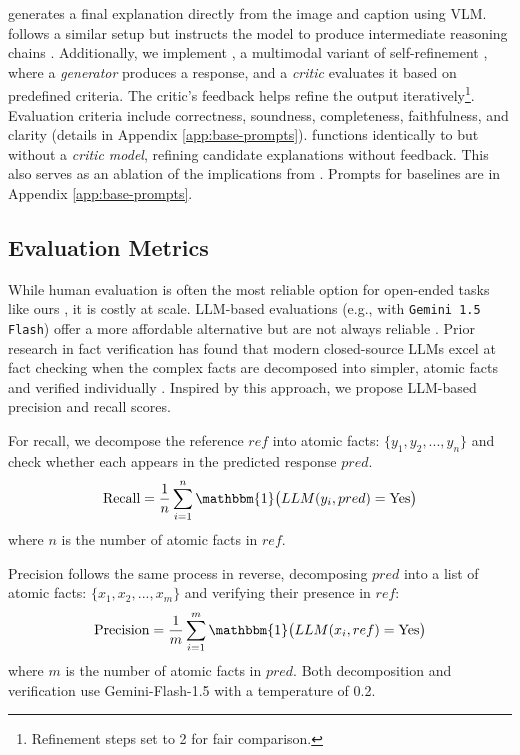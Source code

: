 \base{} generates a final explanation directly from the image and caption using VLM. \chain{} follows a similar setup but instructs the model to produce intermediate reasoning chains \cite{cot}. 
Additionally, we implement \critic{}, a multimodal variant of self-refinement \cite{madaan2023selfrefine}, where a \textit{generator} produces a response, and a \textit{critic} evaluates it based on predefined criteria. The critic's feedback helps refine the output iteratively\footnote{Refinement steps set to 2 for fair comparison.}. Evaluation criteria include correctness, soundness, completeness, faithfulness, and clarity (details in Appendix \ref{app:base-prompts}).
\nocritic{} functions identically to \critic{} but without a \textit{critic model}, refining candidate explanations without feedback. This also serves as an ablation of the implications from \method{}. Prompts for baselines are in Appendix \ref{app:base-prompts}.


\subsection{Evaluation Metrics}
\label{sec:exp_setup:eval}
While human evaluation is often the most reliable option for open-ended tasks like ours \cite{hwang-shwartz-2023-memecap}, it is costly at scale. LLM-based evaluations (e.g., with \texttt{Gemini 1.5 Flash}) offer a more affordable alternative but are not always reliable \cite{biases_paper}. Prior research in fact verification has found that modern closed-source LLMs excel at fact checking when the complex facts are decomposed into simpler, atomic facts and verified individually \cite{gunjal-durrett-2024-molecular, samir-etal-2024-locating}. Inspired by this approach, we propose LLM-based precision and recall scores.

For recall, we decompose the reference $ref$ into atomic facts: $\{y_1, y_2, ..., y_n\}$ and check whether each appears in the predicted response $pred$.
\[
\text{Recall} = \frac{1}{n} \sum_{i=1}^{n} \mathbbm{1} \big( LLM(y_i, pred) = \text{Yes} \big)
\]
where $n$ is the number of atomic facts in $ref$.

Precision follows the same process in reverse, decomposing $pred$ into a list of atomic facts: $\{x_1, x_2, ..., x_m\}$ and verifying their presence in $ref$:
\[
\text{Precision} = \frac{1}{m} \sum_{i=1}^{m} \mathbbm{1} \big( LLM(x_i, ref) = \text{Yes} \big)
\]
where $m$ is the number of atomic facts in $pred$. Both decomposition and verification use Gemini-Flash-1.5 with a temperature of 0.2.

